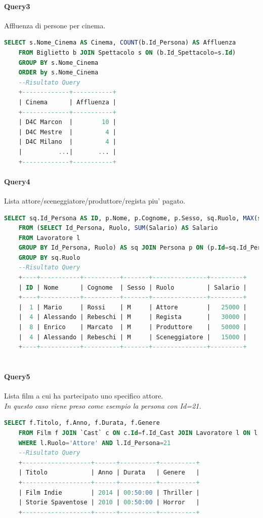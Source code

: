 \documentclass[10pt]{article}
\begin{document}
	\paragraph{Query3}
	Affluenza di persone per cinema.
	\begin{lstlisting}[language=SQL]
	SELECT s.Nome_Cinema AS Cinema, COUNT(b.Id_Persona) AS Affluenza
	FROM Biglietto b JOIN Spettacolo s ON (b.Id_Spettacolo=s.Id)
	GROUP BY s.Nome_Cinema
	ORDER by s.Nome_Cinema	
	--Risultato Query
	+-------------+-----------+
	| Cinema      | Affluenza |
	+-------------+-----------+
	| D4C Marcon  |        10 |
	| D4C Mestre  |         4 |
	| D4C Milano  |         4 |
	|          ...|       ... |
	+-------------+-----------+	
	\end{lstlisting}
	\paragraph{Query4}
	Lista attore/sceneggiatore/produttore/regista piu' pagato.
	\begin{lstlisting}[language=SQL]
	SELECT sq.Id_Persona AS ID, p.Nome, p.Cognome, p.Sesso, sq.Ruolo, MAX(sq.Salario) AS Salario
	FROM (SELECT Id_Persona, Ruolo, SUM(Salario) AS Salario
	FROM Lavoratore l
	GROUP BY Id_Persona, Ruolo) AS sq JOIN Persona p ON (p.Id=sq.Id_Persona)
	GROUP BY sq.Ruolo	
	--Risultato Query
	+----+-----------+----------+-------+---------------+---------+
	| ID | Nome      | Cognome  | Sesso | Ruolo         | Salario |
	+----+-----------+----------+-------+---------------+---------+
	|  1 | Mario     | Rossi    | M     | Attore        |   25000 |
	|  4 | Alessando | Rebeschi | M     | Regista       |   30000 |
	|  8 | Enrico    | Marcato  | M     | Produttore    |   50000 |
	|  4 | Alessando | Rebeschi | M     | Sceneggiatore |   15000 |
	+----+-----------+----------+-------+---------------+---------+
	
	\end{lstlisting}
	\paragraph{Query5}	
	Lista film a cui ha partecipato uno specifico attore. \\\textit{In questo caso viene preso come esempio la persona con Id=21.}
	\begin{lstlisting}[language=SQL]
	SELECT f.Titolo, f.Anno, f.Durata, f.Genere
	FROM Film f JOIN `Cast` c ON c.Id=f.Id_Cast JOIN Lavoratore l ON l.Id_Cast=c.Id
	WHERE l.Ruolo='Attore' AND l.Id_Persona=21	
	--Risultato Query
	+-------------------+------+----------+----------+
	| Titolo            | Anno | Durata   | Genere   |
	+-------------------+------+----------+----------+
	| Film Indie        | 2014 | 00:50:00 | Thriller |
	| Storie Spaventose | 2010 | 00:50:00 | Horror   |
	+-------------------+------+----------+----------+
	
	\end{lstlisting}
\end{document}

